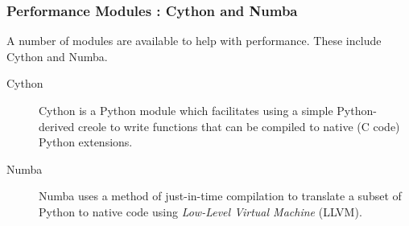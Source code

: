\documentclass[MASTER.tex]{subfiles}
\begin{document}
\begin{frame}
	
	\large
\frametitle{Performance Modules : Cython and Numba}
A number of modules are available to help with performance. These include Cython and Numba.

\begin{description}
	\item[Cython] Cython
	is a Python module which facilitates using a simple Python-derived creole to write functions that can be
	compiled to native (C code) Python extensions. 
	
	
	\item[Numba] 
	Numba uses a method of just-in-time compilation to
	translate a subset of Python to native code using \textit{Low-Level Virtual Machine} (LLVM).
\end{description} 

\end{frame}

\end{document}
